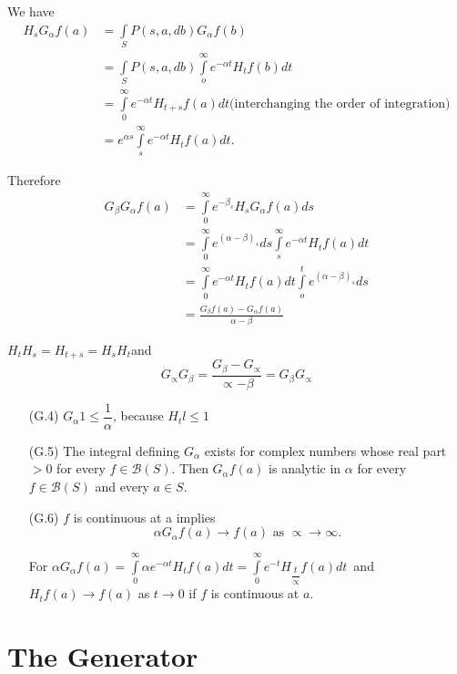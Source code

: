We have
\begin{align*}
  H_s G_\alpha f(a) &= \int\limits_{S}P(s,a, db) G_\alpha f(b) \\
  &= \int\limits_{S} P(s,a, db) \int\limits_{o}^\infty e^{- \alpha t} H_t f(b) dt \\
  &= \int\limits_{0}^\infty e^{- \alpha t} H_{t+s}f(a)dt \text{
    (interchanging the order of integration)}\\ 
  &= e^{\alpha s}\int\limits_{s}^\infty e^{- \alpha t} H_t f(a) dt.
\end{align*}


Therefore
\begin{align*}
  G_\beta G_\alpha f(a) &= \int\limits_{0}^\infty e^{- \beta_s} H_s G_\alpha f(a) ds \\
  &= \int\limits_{0}^\infty e^{ ( \alpha - \beta )_s}ds
  \int\limits_{s}^\infty e^{- \alpha t} H_t f(a) dt \\ 
  &= \int\limits_{0}^\infty e^{- \alpha t} H_t f(a) dt
  \int\limits_{o}^t e^{(\alpha - \beta )_s} ds \\ 
  &= \frac{G_\beta f(a) - G_\alpha f(a)}{\alpha - \beta }
\end{align*}

\begin{remark*}
$H_t H_s = H_{t+s} =H_s H_t$\pageoriginale and 
$$
G_\propto G_\beta = \frac{G_\beta - G_\propto}{\propto - \beta}=
G_\beta G_\propto 
$$
\begin{itemize}
\item[(G.4)] $G_\alpha 1 \le \dfrac{1}{\alpha}$, because $H_tl \le 1$
\item[(G.5)] The integral defining $G_\alpha$ exists for complex
  numbers whose real part $> 0$ for every $f \in \mathscr{B}(S)$. Then
  $G_\alpha f(a)$ is analytic in $\alpha$ for every $f  \in
  \mathscr{B}(S)$ and every $a  \in S$.   
\item[(G.6)] $f$ is continuous at a implies
  $$
  \alpha G_\alpha f(a) \to f(a) \text{ as } \propto \to \infty.
  $$
  
  For $\alpha G_\alpha f(a) = \int\limits_{0}^\infty \alpha e^{-
    \alpha t} H_t f(a) dt = \int\limits_{0}^\infty e^{-t}
  H_{\dfrac{t}{\propto}}f(a) dt$\ 
  and\hfill\break $H_t f(a) \to f(a)$ as  $t \to 0$ if  $f$ is continuous at $a$.
\end{itemize}
\end{remark*}

\section{The Generator}\label{chap1-sec6}

